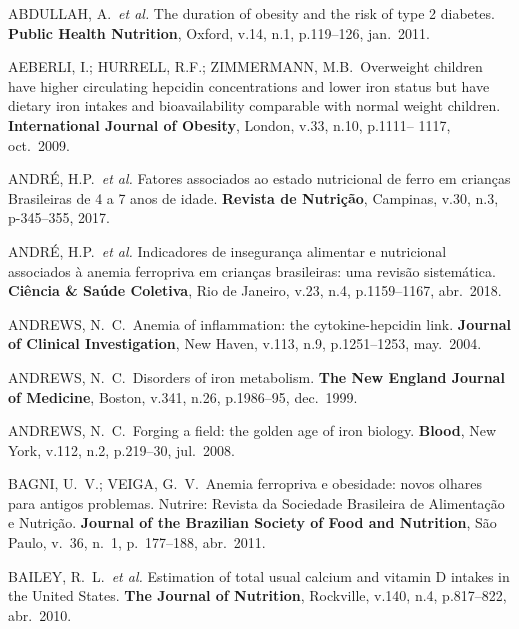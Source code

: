 \noindent ABDULLAH, A.\ \textit{et al.} The duration of obesity and the risk of type 2 diabetes. \textbf{Public Health Nutrition}, Oxford, v.14, n.1, p.119--126, jan.\ 2011.  

\bigbreak

\noindent AEBERLI, I.; HURRELL, R.F.; ZIMMERMANN, M.B.\ Overweight children have higher circulating hepcidin concentrations and lower iron status but have dietary iron intakes and bioavailability comparable with normal weight children. \textbf{International Journal of Obesity}, London, v.33, n.10, p.1111– 1117, oct.\ 2009. 

\bigbreak

\noindent ANDRÉ, H.P.\ \textit{et al.} Fatores associados ao estado nutricional de ferro em crianças Brasileiras de 4 a 7 anos de idade. \textbf{Revista de Nutrição}, Campinas, v.30, n.3, p-345--355, 2017.

\bigbreak

\noindent ANDRÉ, H.P.\ \textit{et al.} Indicadores de insegurança alimentar e nutricional associados à anemia ferropriva em crianças brasileiras: uma revisão sistemática. \textbf{Ciência \& Saúde Coletiva}, Rio de Janeiro, v.23, n.4, p.1159--1167, abr.\ 2018.

\bigbreak

\noindent ANDREWS, N.\ C.\ Anemia of inflammation: the cytokine-hepcidin link. \textbf{Journal of Clinical Investigation}, New Haven, v.113, n.9, p.1251--1253, may.\ 2004.

\bigbreak

\noindent ANDREWS, N.\ C.\ Disorders of iron metabolism. \textbf{The New England Journal of Medicine}, Boston, v.341, n.26, p.1986–95, dec.\ 1999.

\bigbreak

\noindent ANDREWS, N.\ C.\ Forging a field: the golden age of iron biology. \textbf{Blood}, New York, v.112, n.2, p.219–30, jul.\ 2008.

\bigbreak
 
\noindent BAGNI, U.\ V.; VEIGA, G.\ V.\ Anemia ferropriva e obesidade: novos olhares para antigos problemas. Nutrire: Revista da Sociedade Brasileira de Alimentação e Nutrição. \textbf{Journal of the Brazilian Society of Food and Nutrition}, São Paulo, v.\ 36, n.\ 1, p.\ 177--188, abr.\ 2011.

\bigbreak

\noindent BAILEY, R.\ L.\ \textit{et al.} Estimation of total usual calcium and vitamin D intakes in the United States. \textbf{The Journal of Nutrition}, Rockville, v.140, n.4, p.817--822, abr.\ 2010.

